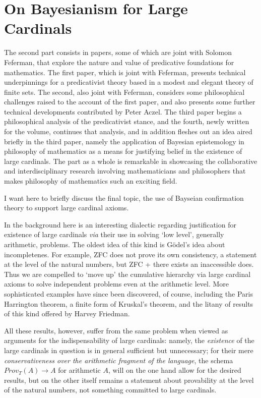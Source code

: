 \documentclass{asl}
\theoremstyle{definition}
\begin{document}
\section{On Bayesianism for Large Cardinals}

The second part consists in papers, some of which are joint with Solomon Feferman, that explore the nature and value of predicative foundations for mathematics. The first paper, which is joint with Feferman, presents technical underpinnings for a predicativist theory based in a modest and elegant theory of finite sets. The second, also joint with Feferman, considers some philosophical challenges raised to the account of the first paper, and also presents some further technical developments contributed by Peter Aczel. The third paper begins a philosophical analysis of the predicativist stance, and the fourth, newly written for the volume, continues that analysis, and in addition fleshes out an idea aired briefly in the third paper, namely the application of Bayesian epistemology in philosophy of mathematics as a means for justifying belief in the existence of large cardinals. The part as a whole is remarkable in showcasing the collaborative and interdisciplinary research involving mathematicians and philosophers that makes philosophy of mathematics such an exciting field.

I want here to briefly discuss the final topic, the use of Bayseian confirmation theory to support large cardinal axioms.

In the background here is an interesting dialectic regarding justification for existence of large cardinals \emph{via} their use in solving `low level', generally arithmetic, problems. The oldest idea of this kind is G\"odel's idea about incompletenes. For example, ZFC does not prove its own consistency, a statement at the level of the natural numbers, but ZFC + there exists an inaccessible does. Thus we are compelled to `move up' the cumulative hierarchy via large cardinal axioms to solve independent problems even at the arithmetic level. More sophisticated examples have since been discovered, of course, including the Paris Harrington theorem, a finite form of Kruskal's theorem, and the litany of results of this kind offered by Harvey Friedman.

All these results, however, suffer from the same problem when viewed as arguments for the indispensability of large cardinals: namely, the \emph{existence} of the large cardinals in question is in general sufficient but unnecessary; for their mere \emph{conservativeness over the arithmetic fragment of the language}, the schema $Prov_T(A) \rightarrow A$ for arithmetic $A$, will on the one hand allow for the desired results, but on the other itself remains a statement about provability at the level of the natural numbers, not something committed to large cardinals.
\end{document}
